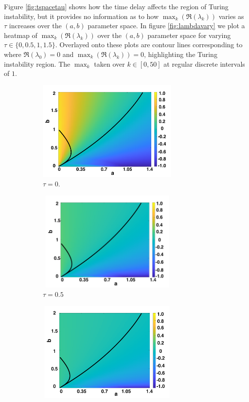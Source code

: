 Figure \ref{fig:tspacetau} shows how the time delay affects the region of Turing instability, but it provides no information as to how $\max_k(\Re(\lambda_k))$ varies as $\tau$ increases over the $(a,b)$ parameter space. In figure \ref{fig:lambdavary} we plot a heatmap of $\max_k(\Re(\lambda_k))$ over the $(a,b)$ parameter space for varying $\tau\in\{0,0.5,1,1.5\}$. Overlayed onto these plots are contour lines corresponding to where $\Re(\lambda_0)=0$ and $\max_k(\Re(\lambda_k))=0$,
highlighting the Turing instability region. The $\max_k$ taken over $k\in[0,50]$ at regular discrete intervals of $1$.
\begin{figure}[H]
    \centering
    \begin{subfigure}[b]{0.45\textwidth}
        \centering
        \includegraphics[width=7cm,height=5cm]{tau0bif.png}
        \caption{$\tau=0$.}
        \label{}
    \end{subfigure}
    \hfill
    \begin{subfigure}[b]{0.45\textwidth}
        \centering
        \includegraphics[width=7cm,height=5cm]{tau05bif.png}
        \caption{$\tau=0.5$}
        \label{}
    \end{subfigure}
    \hfill
    \begin{subfigure}[b]{0.45\textwidth}
        \centering
        \includegraphics[width=7cm,height=5cm]{tau1bif.png}

\end{subfigure}
\end{figure}
